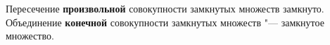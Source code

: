 
Пересечение \textbf{произвольной} совокупности замкнутых множеств замкнуто. Объединение \textbf{конечной} совокупности замкнутых множеств "--- замкнутое множество.
 